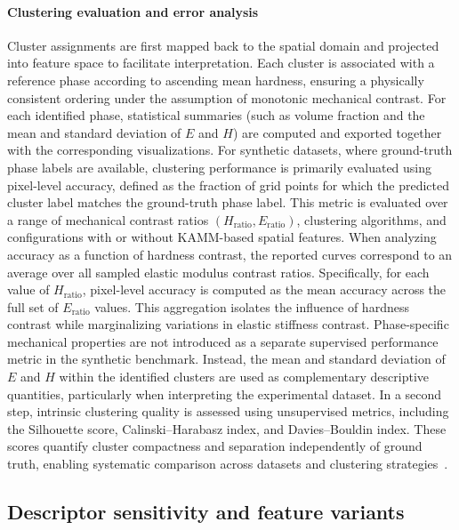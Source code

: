 \documentclass[final,3p,times]{elsarticle}
\begin{document}
\paragraph{Clustering evaluation and error analysis} Cluster assignments are first mapped back to the spatial domain and projected into feature space to facilitate interpretation. Each cluster is associated with a reference phase according to ascending mean hardness, ensuring a physically consistent ordering under the assumption of monotonic mechanical contrast. For each identified phase, statistical summaries (such as volume fraction and the mean and standard deviation of $E$ and $H$) are computed and exported together with the corresponding visualizations. For synthetic datasets, where ground-truth phase labels are available, clustering performance is primarily evaluated using pixel-level accuracy, defined as the fraction of grid points for which the predicted cluster label matches the ground-truth phase label. This metric is evaluated over a range of mechanical contrast ratios $(H_\mathrm{ratio}, E_\mathrm{ratio})$, clustering algorithms, and configurations with or without KAMM-based spatial features. When analyzing accuracy as a function of hardness contrast, the reported curves correspond to an average over all sampled elastic modulus contrast ratios. Specifically, for each value of $H_\mathrm{ratio}$, pixel-level accuracy is computed as the mean accuracy across the full set of $E_\mathrm{ratio}$ values. This aggregation isolates the influence of hardness contrast while marginalizing variations in elastic stiffness contrast. Phase-specific mechanical properties are not introduced as a separate supervised performance metric in the synthetic benchmark. Instead, the mean and standard deviation of $E$ and $H$ within the identified clusters are used as complementary descriptive quantities, particularly when interpreting the experimental dataset. In a second step, intrinsic clustering quality is assessed using unsupervised metrics, including the Silhouette score, Calinski--Harabasz index, and Davies--Bouldin index. These scores quantify cluster compactness and separation independently of ground truth, enabling systematic comparison across datasets and clustering strategies~\cite{Rubinos_2024}.

\subsection{Descriptor sensitivity and feature variants}
\end{document}
